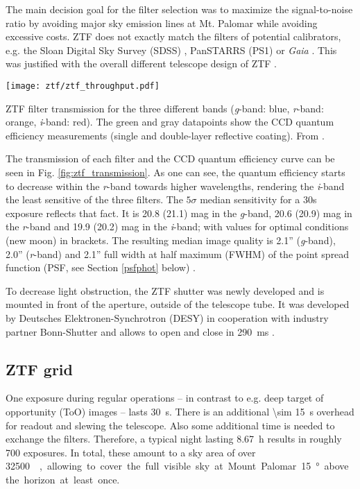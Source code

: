 The main decision goal for the filter selection was to maximize the signal-to-noise ratio by avoiding major sky emission lines at Mt. Palomar while avoiding excessive costs. ZTF does not exactly match the filters of potential calibrators, e.g. the Sloan Digital Sky Survey (SDSS) , PanSTARRS (PS1)  or \textit{Gaia} . This was justified with the overall different telescope design of ZTF \cite{Bellm2019}.

\begin{marginfigure}
    \texttt{[image: ztf/ztf\_throughput.pdf]}
    \caption[ZTF filter transmission]{ZTF filter transmission for the three different bands (\textit{g}-band: blue, \textit{r}-band: orange, \textit{i}-band: red). The green and gray datapoints show the CCD quantum efficiency measurements (single and double-layer reflective coating). From \cite{Bellm2019}.}
\end{marginfigure}

The transmission of each filter and the CCD quantum efficiency curve can be seen in Fig. \ref{fig:ztf_transmission}. As one can see, the quantum efficiency starts to decrease within the \textit{r}-band towards higher wavelengths, rendering the \textit{i}-band the least sensitive of the three filters. The $5\sigma$ median sensitivity for a 30s exposure reflects that fact. It is 20.8 (21.1) mag in the \textit{g}-band, 20.6 (20.9) mag in the \textit{r}-band and 19.9 (20.2) mag in the \textit{i}-band; with values for optimal conditions (new moon) in brackets. The resulting median image quality is 2.1'' (\textit{g}-band), 2.0'' (\textit{r}-band) and 2.1'' full width at half maximum (FWHM) of the point spread function (PSF, see Section \ref{psfphot} below) \cite{Bellm2019}.

To decrease light obstruction, the ZTF shutter was newly developed and is mounted in front of the aperture, outside of the telescope tube. It was developed by Deutsches Elektronen-Synchrotron (DESY) in cooperation with industry partner Bonn-Shutter and allows to open and close in \SI{290}{\milli \second} \cite{Dekany2020}.

\subsection{ZTF grid} \label{ztf_grid}
One exposure during regular operations -- in contrast to e.g. deep target of opportunity (ToO) images -- lasts \SI{30}{\second}. There is an additional \SI{\sim 15}{\second} overhead for readout and slewing the telescope. Also some additional time is needed to exchange the filters. Therefore, a typical night lasting \SI{8.67}{\hour}  results in roughly 700 exposures. In total, these amount to a sky area of over \SI{32500}{\square\deg}, allowing to cover the full visible sky at Mount Palomar \SI{15}{\degree} above the horizon at least once.

